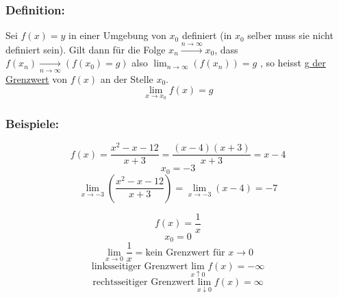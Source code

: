 \documentclass[11pt]{amsart}
\theoremstyle{remark}
\begin{document}
\subsubsection*{Definition:}
Sei $f(x) = y$ in einer Umgebung von $x_0$ definiert (in $x_0$ selber muss sie nicht definiert sein). Gilt dann f\"ur die Folge $x_n \xrightarrow{n \to \infty} x_0$, dass $f(x_n) \xrightarrow[n \to \infty]{} (f(x_0) = g)$ also $\lim_{n \to \infty} (f(x_n)) = g$ , so heisst \underline{g der Grenzwert} von $f(x)$ an der Stelle $x_0$.\\
\begin{equation*}
\lim_{x \to x_0} f(x) = g
\end{equation*}
\subsubsection*{Beispiele:} 
\begin{equation}
	f(x) = \frac{x^2 - x -12}{x+3} = \frac{(x-4)(x+3)}{x+3} = x-4
\end{equation}
\begin{equation*}
	x_0 = -3
\end{equation*}
\begin{equation*}
	\lim_{x \to -3} \left(\frac{x^2-x-12}{x+3}\right) = \lim_{x \to -3} (x-4) = -7
\end{equation*}
\begin{figure}[h]
  \centering
 \end{figure}
\begin{equation}
	f(x) = \frac 1x 
\end{equation}
\begin{equation*}
	x_0 = 0
\end{equation*}
\begin{equation*}
	\lim_{x \to 0} \frac 1x = \text{kein Grenzwert f\"ur $x \to 0$}
\end{equation*}
\begin{equation*}
	\text{linksseitiger Grenzwert}\lim_{x \uparrow 0} f(x) = -\infty
\end{equation*}
\begin{equation*}
	\text{rechtsseitiger Grenzwert}\lim_{x \downarrow 0} f(x) = \infty
\end{equation*}
\end{document}
